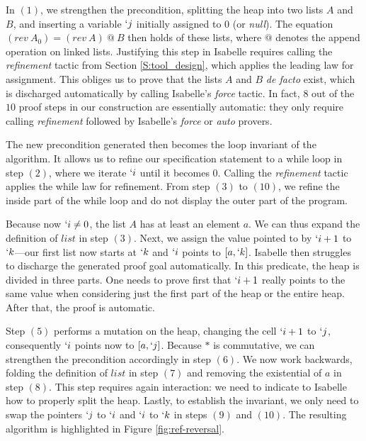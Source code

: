 \documentclass[twoside,runningheads,envcountsame,envcountsect,oribibl,orivec]{llncs}
\begin{document}
In $(1)$, we strengthen the precondition, splitting the heap into two
lists $A$ and $B$, and inserting a variable $`j$ initially assigned to
$0$ (or \emph{null}). The equation $(rev\ A_0) = (rev\ A)\ @\ B$ then
holds of these lists, where $@$ denotes the append operation on linked
lists. Justifying this step in Isabelle requires calling the
\emph{refinement} tactic from Section \ref{S:tool_design}, which
applies the leading law for assignment. This obliges us to prove that
the lists $A$ and $B$ \emph{de facto} exist, which is discharged
automatically by calling Isabelle's \emph{force} tactic.  In fact, $8$
out of the $10$ proof steps in our construction are essentially
automatic: they only require calling \emph{refinement} followed by
Isabelle's \emph{force} or \emph{auto} provers.

The new precondition generated then becomes the loop invariant of the
algorithm. It allows us to refine our specification statement to a
while loop in step $(2)$, where we iterate $`i$ until it becomes $0$.
Calling the \emph{refinement} tactic applies the while law for
refinement.  From step $(3)$ to $(10)$, we refine the inside part of
the while loop and do not display the outer part of the program.

Because now $`i \neq 0$, the list $A$ has at least an element $a$. We
can thus expand the definition of $list$ in step $(3)$. Next, we
assign the value pointed to by $`i + 1$ to $`k$---our first list now
starts at $`k$ and $`i$ points to $[a, `k]$.  Isabelle then struggles
to discharge the generated proof goal automatically.  In this
predicate, the heap is divided in three parts. One needs to prove
first that $`i + 1$ really points to the same value when considering
just the first part of the heap or the entire heap. After that, the
proof is automatic.

Step $(5)$ performs a mutation on the heap, changing the cell $`i + 1$
to $`j$, consequently $`i$ points now to $[a, `j]$.  Because $\ast$ is
commutative, we can strengthen the precondition accordingly in step
$(6)$.  We now work backwards, folding the definition of $list$ in
step $(7)$ and removing the existential of $a$ in step $(8)$. This
step requires again interaction: we need to indicate to Isabelle how
to properly split the heap.  Lastly, to establish the invariant, we
only need to swap the pointers $`j$ to $`i$ and $`i$ to $`k$ in steps
$(9)$ and $(10)$. The resulting algorithm is highlighted in Figure
\ref{fig:ref-reversal}.
\end{document}
